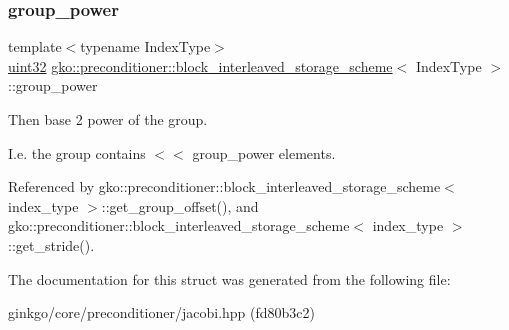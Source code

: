 \subsubsection{\texorpdfstring{group\+\_\+power}{group\_power}}
{\footnotesize\ttfamily template$<$typename Index\+Type$>$ \\
\hyperlink{namespacegko_a318c831e3fe269ba04c6ed8bf5a71073}{uint32} \hyperlink{structgko_1_1preconditioner_1_1block__interleaved__storage__scheme}{gko\+::preconditioner\+::block\+\_\+interleaved\+\_\+storage\+\_\+scheme}$<$ Index\+Type $>$\+::group\+\_\+power}



Then base 2 power of the group. 

I.\+e. the group contains { $<$$<$ group\+\_\+power} elements. 

Referenced by gko\+::preconditioner\+::block\+\_\+interleaved\+\_\+storage\+\_\+scheme$<$ index\+\_\+type $>$\+::get\+\_\+group\+\_\+offset(), and gko\+::preconditioner\+::block\+\_\+interleaved\+\_\+storage\+\_\+scheme$<$ index\+\_\+type $>$\+::get\+\_\+stride().



The documentation for this struct was generated from the following file\+:\begin{DoxyCompactItemize}
\item 
ginkgo/core/preconditioner/jacobi.\+hpp (fd80b3c2)\end{DoxyCompactItemize}
